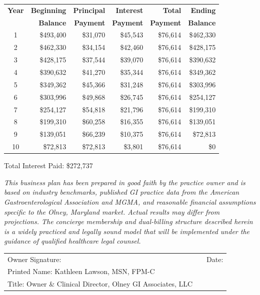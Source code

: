 \documentclass[11pt,letterpaper]{article}
\newcommand{\thead}[1]{\cellcolor{navy}\color{white}\bfseries\small #1}
\newcommand{\ownername}{Kathleen Lawson}
\begin{document}
\medskip

\vspace{1.0cm}

\begin{center}
\begin{tabular}{|c|r|r|r|r|r|}
\hline
\thead{Year} & \thead{Beginning} & \thead{Principal} & \thead{Interest} & \thead{Total} & \thead{Ending} \\
 & \thead{Balance} & \thead{Payment} & \thead{Payment} & \thead{Payment} & \thead{Balance} \\
\hline
1 & \$493,400 & \$31,070 & \$45,543 & \$76,614 & \$462,330 \\
2 & \$462,330 & \$34,154 & \$42,460 & \$76,614 & \$428,175 \\
3 & \$428,175 & \$37,544 & \$39,070 & \$76,614 & \$390,632 \\
4 & \$390,632 & \$41,270 & \$35,344 & \$76,614 & \$349,362 \\
5 & \$349,362 & \$45,366 & \$31,248 & \$76,614 & \$303,996 \\
6 & \$303,996 & \$49,868 & \$26,745 & \$76,614 & \$254,127 \\
7 & \$254,127 & \$54,818 & \$21,796 & \$76,614 & \$199,310 \\
8 & \$199,310 & \$60,258 & \$16,355 & \$76,614 & \$139,051 \\
9 & \$139,051 & \$66,239 & \$10,375 & \$76,614 & \$72,813 \\
10 & \$72,813 & \$72,813 & \$3,801 & \$76,614 & \$0 \\
\hline
\end{tabular}
\end{center}

Total Interest Paid: \$272,737

\vspace{1.8cm}
\noindent{\color{teal}\rule{\linewidth}{0.6pt}}

\medskip
\textit{\small This business plan has been prepared in good faith by the practice owner and is based on industry benchmarks, published GI practice data from the American Gastroenterological Association and MGMA, and reasonable financial assumptions specific to the Olney, Maryland market. Actual results may differ from projections. The concierge membership and dual-billing structure described herein is a widely practiced and legally sound model that will be implemented under the guidance of qualified healthcare legal counsel.}

\vspace{2cm}

\noindent
\begin{tabular}{@{}p{8cm}p{0.5cm}p{5cm}@{}}
Owner Signature: \underline{\hspace{6cm}} & & Date: \underline{\hspace{3.5cm}} \\[20pt]
Printed Name: {\ownername, MSN, FPM-C} & & \\[14pt]
Title: Owner \& Clinical Director, Olney GI Associates, LLC & & \\
\end{tabular}
\end{document}
